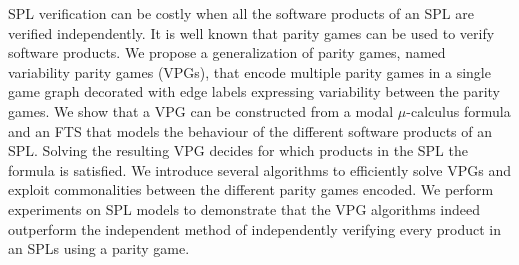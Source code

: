 SPL verification can be costly when all the software products of an SPL are verified independently. It is well known that parity games can be used to verify software products. We propose a generalization of parity games, named variability parity games (VPGs), that encode multiple parity games in a single game graph decorated with edge labels expressing variability between the parity games. We show that a VPG can be constructed from a modal $\mu$-calculus formula and an FTS that models the behaviour of the different software products of an SPL. Solving the resulting VPG decides for which products in the SPL the formula is satisfied. We introduce several algorithms to efficiently solve VPGs and exploit commonalities between the different parity games encoded. We perform experiments on SPL models to demonstrate that the VPG algorithms indeed outperform the independent method of independently verifying every product in an SPLs using a parity game.
